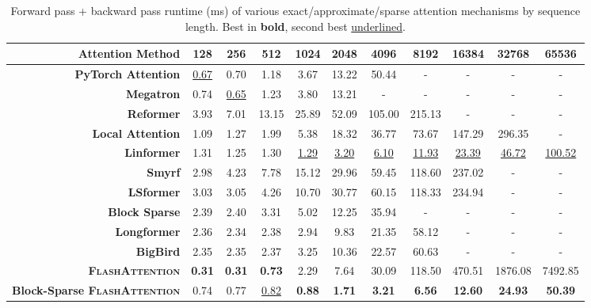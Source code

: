 \documentclass{article}
\newcommand{\sysname}{\textsc{FlashAttention}\xspace}
\begin{document}
\begin{table}
\centering
\scriptsize
\captionsetup{font=small}
\caption{Forward pass + backward pass runtime (ms) of various exact/approximate/sparse attention mechanisms by sequence length. Best in \textbf{bold}, second best \underline{underlined}.}
\begin{tabular}{@{}r|cccccccccc@{}}
\toprule
\textbf{Attention Method} & 128 & 256 & 512 & 1024 & 2048 & 4096 & 8192 & 16384 & 32768 & 65536 \\
\hline
\textbf{PyTorch Attention} & \underline{0.67} & 0.70 & 1.18 & 3.67 & 13.22 & 50.44 & - & - & - & - \\
\textbf{Megatron} & 0.74 & \underline{0.65} & 1.23 & 3.80 & 13.21 & - & - & - & - & - \\
\hline
\textbf{Reformer} & 3.93 & 7.01 & 13.15 & 25.89 & 52.09 & 105.00 & 215.13 & - & - & - \\
\textbf{Local Attention} & 1.09 & 1.27 & 1.99 & 5.38 & 18.32 & 36.77 & 73.67 & 147.29 & 296.35 & - \\
\textbf{Linformer} & 1.31 & 1.25 & 1.30 & \underline{1.29} & \underline{3.20} & \underline{6.10} & \underline{11.93} & \underline{23.39} & \underline{46.72} & \underline{100.52} \\
\textbf{Smyrf} & 2.98 & 4.23 & 7.78 & 15.12 & 29.96 & 59.45 & 118.60 & 237.02 & - & - \\
\textbf{LSformer} & 3.03 & 3.05 & 4.26 & 10.70 & 30.77 & 60.15 & 118.33 & 234.94 & - & - \\
\hline
\textbf{Block Sparse} & 2.39 & 2.40 & 3.31 & 5.02 & 12.25 & 35.94 & - & - & - & - \\
\textbf{Longformer} & 2.36 & 2.34 & 2.38 & 2.94 & 9.83 & 21.35 & 58.12 & - & - & - \\
\textbf{BigBird} & 2.35 & 2.35 & 2.37 & 3.25 & 10.36 & 22.57 & 60.63 & - & - & - \\
\hline
\textbf{\sysname} & \textbf{0.31} & \textbf{0.31} & \textbf{0.73} & 2.29 & 7.64 & 30.09 & 118.50 & 470.51 & 1876.08 & 7492.85 \\
\textbf{Block-Sparse \sysname} & 0.74 & 0.77 & \underline{0.82} & \textbf{0.88} & \textbf{1.71} & \textbf{3.21} & \textbf{6.56} & \textbf{12.60} & \textbf{24.93} & \textbf{50.39} \\
\bottomrule
\end{tabular}
\label{tab:combined}
\end{table}
\end{document}
